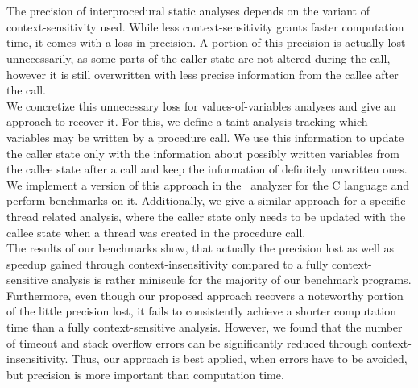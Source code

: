 \chapter{\abstractname}

The precision of interprocedural static analyses depends on the variant of context-sensitivity used. While less context-sensitivity grants faster computation time, it comes with a loss in precision. A portion of this precision is actually lost unnecessarily, as some parts of the caller state are not altered during the call, however it is still overwritten with less precise information from the callee after the call.\\
We concretize this unnecessary loss for values-of-variables analyses and give an approach to recover it. For this, we define a taint analysis tracking which variables may be written by a procedure call. We use this information to update the caller state only with the information about possibly written variables from the callee state after a call and keep the information of definitely unwritten ones. We implement a version of this approach in the \gob\ analyzer for the C language and perform benchmarks on it. Additionally, we give a similar approach for a specific thread related analysis, where the caller state only needs to be updated with the callee state when a thread was created in the procedure call.\\
The results of our benchmarks show, that actually the precision lost as well as speedup gained through context-insensitivity compared to a fully context-sensitive analysis is rather miniscule for the majority of our benchmark programs. Furthermore, even though our proposed approach recovers a noteworthy portion of the little precision lost, it fails to consistently achieve a shorter computation time than a fully context-sensitive analysis. However, we found that the number of timeout and stack overflow errors can be significantly reduced through context-insensitivity. Thus, our approach is best applied, when errors have to be avoided, but precision is more important than computation time. %

